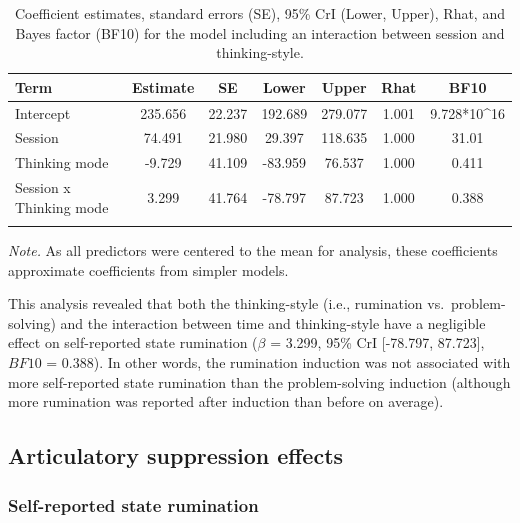 \documentclass[a4paper,12pt,twoside,openright,oldfontcommands]{memoir}
\begin{document}
\begin{table}[H]
\begin{center}
\begin{threeparttable}
\caption{\label{tab:ParamInteraction}Coefficient estimates, standard errors (SE), 95\% CrI (Lower, Upper), Rhat, and Bayes factor (BF10) for the model including an interaction between session and thinking-style.}
\small{
\begin{tabular}{lcccccc}
\toprule
Term & \multicolumn{1}{c}{Estimate} & \multicolumn{1}{c}{SE} & \multicolumn{1}{c}{Lower} & \multicolumn{1}{c}{Upper} & \multicolumn{1}{c}{Rhat} & \multicolumn{1}{c}{BF10}\\
\midrule
Intercept & 235.656 & 22.237 & 192.689 & 279.077 & 1.001 & 9.728*10\textasciicircum{}16\\
Session & 74.491 & 21.980 & 29.397 & 118.635 & 1.000 & 31.01\\
Thinking mode & -9.729 & 41.109 & -83.959 & 76.537 & 1.000 & 0.411\\
Session x Thinking mode & 3.299 & 41.764 & -78.797 & 87.723 & 1.000 & 0.388\\
\bottomrule
\addlinespace
\end{tabular}
}
\begin{tablenotes}[para]
\textit{Note.} As all predictors were centered to the mean for analysis, these coefficients approximate coefficients from simpler models.
\end{tablenotes}
\end{threeparttable}
\end{center}
\end{table}

This analysis revealed that both the thinking-style (i.e., rumination vs.~problem-solving) and the interaction between time and thinking-style have a negligible effect on self-reported state rumination (\(\beta\) = 3.299, 95\% CrI {[}-78.797, 87.723{]}, \(BF10\) = 0.388). In other words, the rumination induction was not associated with more self-reported state rumination than the problem-solving induction (although more rumination was reported after induction than before on average).

\hypertarget{articulatory-suppression-effects-2}{%
\subsection{Articulatory suppression effects}\label{articulatory-suppression-effects-2}}

\hypertarget{self-reported-state-rumination}{%
\subsubsection{Self-reported state rumination}\label{self-reported-state-rumination}}
\end{document}
